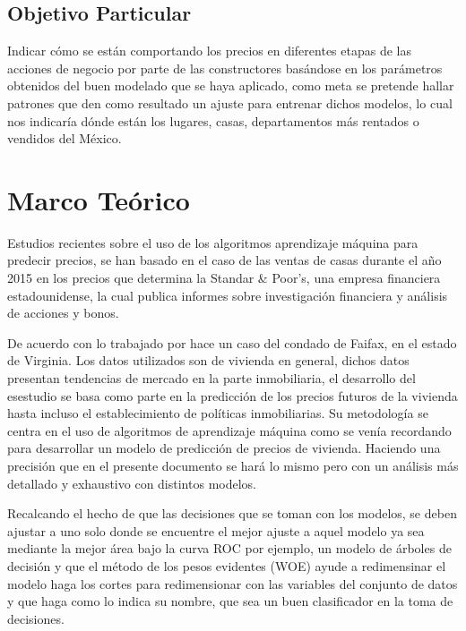 \documentclass[a4paper,12pt]{article}
\begin{document}
\subsection{Objetivo Particular}
Indicar cómo se están comportando los precios en diferentes etapas de las acciones de negocio por parte de las constructores 
basándose en los parámetros obtenidos del buen modelado que se haya aplicado, como meta se pretende hallar patrones que den como 
resultado un ajuste para entrenar dichos modelos, lo cual nos indicaría  dónde están los lugares, casas, departamentos  más 
rentados o vendidos del México.
\section{Marco Teórico}%
Estudios recientes sobre el uso de los algoritmos aprendizaje máquina para predecir precios, se han basado en el caso de las 
ventas de casas durante el año 2015 en los precios que determina la Standar \& Poor's, una empresa financiera estadounidense, la 
cual publica informes sobre investigación financiera y análisis de acciones  y bonos.\\
\vspace{3mm}

De acuerdo con lo trabajado por \cite{park2015using} hace un caso del condado de Faifax, en el estado de Virginia. Los datos 
utilizados son de vivienda en general, dichos datos presentan tendencias de mercado en la parte inmobiliaria, el desarrollo del 
esestudio se basa como parte  en la predicción de los precios futuros de la vivienda hasta incluso el establecimiento de 
políticas inmobiliarias. Su metodología se centra en el uso de algoritmos de aprendizaje máquina como se venía recordando para 
desarrollar un modelo de predicción de precios de vivienda. Haciendo una precisión que en el presente documento se hará lo mismo 
pero con un análisis más detallado y exhaustivo con distintos modelos.
\vspace{5mm}

Recalcando el hecho de que las decisiones que se toman con los modelos, se deben ajustar a uno solo donde se encuentre el mejor 
ajuste a aquel modelo ya sea mediante la mejor área bajo la curva ROC por ejemplo, un modelo de árboles de decisión y que el 
método de los pesos evidentes (WOE) ayude a redimensinar el modelo haga los cortes para redimensionar con las variables del 
conjunto de datos y que haga como lo indica su nombre, que sea un buen clasificador en la toma de decisiones.
\vspace{5mm}
\end{document}
